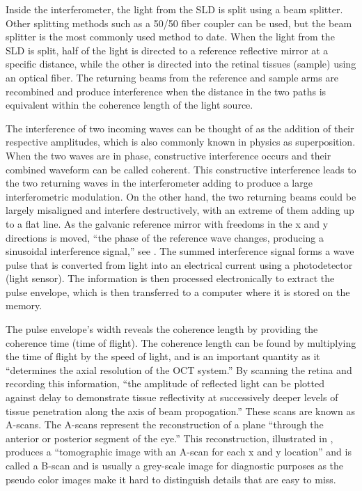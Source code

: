 Inside the interferometer, the light from the SLD is split using a beam splitter.  Other splitting methods such as a 50/50 fiber coupler can be used, but the beam splitter is the most commonly used method to date.  When the light from the SLD is split, half of the light is directed to a reference reflective mirror at a specific distance, while the other is directed into the retinal tissues (sample) using an optical fiber.  The returning beams from the reference and sample arms are recombined and produce interference when the distance in the two paths is equivalent within the coherence length of the light source. \cite{} \cite{}

The interference of two incoming waves can be thought of as the addition of their respective amplitudes, which is also commonly known in physics as superposition.  When the two waves are in phase, constructive interference occurs and their combined waveform can be called coherent.  This constructive interference leads to the two returning waves in the interferometer adding to produce a large interferometric modulation.  On the other hand, the two returning beams could be largely misaligned and interfere destructively, with an extreme of them adding up to a flat line.  As the galvanic reference mirror with freedoms in the x and y directions is moved, “the phase of the reference wave changes, producing a sinusoidal interference signal,” \cite{} see . The summed interference signal forms a wave pulse that is converted from light into an electrical current using a photodetector (light sensor).   The information is then processed electronically to extract the pulse envelope, which is then transferred to a computer where it is stored on the memory.  \cite{}


The pulse envelope’s width reveals the coherence length by providing the coherence time (time of flight).  The coherence length can be found by multiplying the time of flight by the speed of light, and is an important quantity as it “determines the axial resolution of the OCT system.” \cite{}  By scanning the retina and recording this information, “the amplitude of reflected light can be plotted against delay to demonstrate tissue reflectivity at successively deeper levels of tissue penetration along the axis of beam propogation.” \cite{}  These scans are known as A-scans.  The A-scans represent the reconstruction of a plane “through the anterior or posterior segment of the eye.” \cite{} This reconstruction, illustrated in , produces a “tomographic image with an A-scan for each x and y location” \cite{} and is called a B-scan and is usually a grey-scale image for diagnostic purposes as the pseudo color images make it hard to distinguish details that are easy to miss. \cite{}  

